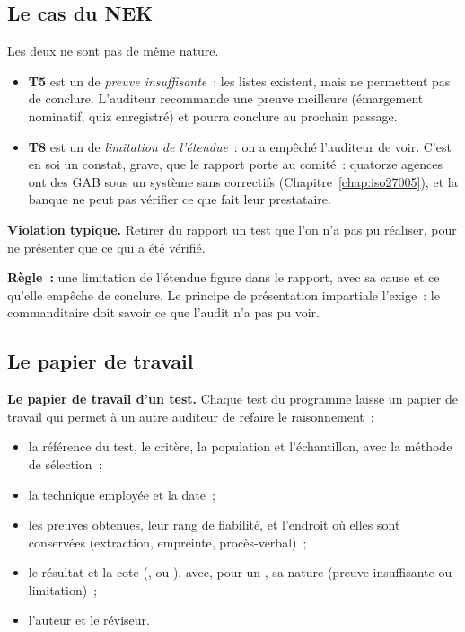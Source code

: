 \subsection{Le cas du NEK}

Les deux \NEK{} ne sont pas de même nature.

\begin{itemize}
    \item \textbf{T5} est un \NEK{} de \emph{preuve insuffisante}~: les
          listes existent, mais ne permettent pas de conclure. L'auditeur
          recommande une preuve meilleure (émargement nominatif, quiz
          enregistré) et pourra conclure au prochain passage.
    \item \textbf{T8} est un \NEK{} de \emph{limitation de l'étendue}~: on
          a empêché l'auditeur de voir. C'est en soi un constat, grave, que
          le rapport porte au comité~: quatorze agences ont des GAB sous un
          système sans correctifs (Chapitre~\ref{chap:iso27005}), et la
          banque ne peut pas vérifier ce que fait leur prestataire.
\end{itemize}

\begin{boxalert}
\textbf{Violation typique.} Retirer du rapport un test que l'on n'a pas pu
réaliser, pour ne présenter que ce qui a été vérifié.

\smallskip
\textbf{Règle~:} une limitation de l'étendue figure dans le rapport, avec
sa cause et ce qu'elle empêche de conclure. Le principe de présentation
impartiale l'exige~: le commanditaire doit savoir ce que l'audit n'a pas
pu voir.
\end{boxalert}

\subsection{Le papier de travail}

\begin{boxprocedure}
\textbf{Le papier de travail d'un test.} Chaque test du programme laisse
un papier de travail qui permet à un autre auditeur de refaire le
raisonnement~:
\begin{itemize}
    \item la référence du test, le critère, la population et l'échantillon,
          avec la méthode de sélection~;
    \item la technique employée et la date~;
    \item les preuves obtenues, leur rang de fiabilité, et l'endroit où
          elles sont conservées (extraction, empreinte, procès-verbal)~;
    \item le résultat et la cote (\OUI{}, \NON{} ou \NEK{}), avec, pour un
          \NEK{}, sa nature (preuve insuffisante ou limitation)~;
    \item l'auteur et le réviseur.
\end{itemize}
\end{boxprocedure}

